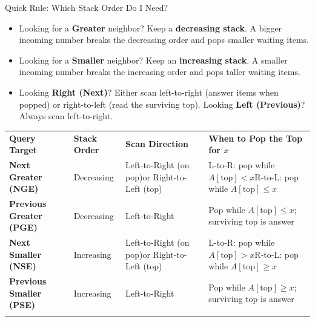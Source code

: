 \documentclass[11pt,a4paper]{article}
\theoremstyle{definition}
\begin{document}
\begin{calloutbox}{Quick Rule: Which Stack Order Do I Need?}
\begin{itemize}
    \item Looking for a \textbf{Greater} neighbor? Keep a \textbf{decreasing stack}. A bigger incoming number breaks the decreasing order and pops smaller waiting items.
    \item Looking for a \textbf{Smaller} neighbor? Keep an \textbf{increasing stack}. A smaller incoming number breaks the increasing order and pops taller waiting items.
    \item Looking \textbf{Right (Next)}? Either scan left-to-right (answer items when popped) or right-to-left (read the surviving top). Looking \textbf{Left (Previous)}? Always scan left-to-right.
\end{itemize}
\end{calloutbox}

\begin{center}
\begingroup
\small
{}
\begin{tabularx}{\textwidth}{>{\raggedright\arraybackslash\bfseries}p{2.9cm} >{\raggedright\arraybackslash}p{2.2cm} >{\raggedright\arraybackslash}p{3.4cm} >{\raggedright\arraybackslash}X}
\arrayrulecolor{primaryblue}\toprule[1.2pt]
\rowcolor{primaryblue!10}
\textcolor{primaryblue}{\textbf{Query Target}} & \textcolor{primaryblue}{\textbf{Stack Order}} & \textcolor{primaryblue}{\textbf{Scan Direction}} & \textcolor{primaryblue}{\textbf{When to Pop the Top for $x$}} \\
\arrayrulecolor{codeframe}\midrule[0.6pt]
Next Greater (NGE) & Decreasing & Left-to-Right (on pop)\newline or Right-to-Left (top) & L-to-R: pop while $A[\text{top}] < x$\newline R-to-L: pop while $A[\text{top}] \le x$ \\
Previous Greater (PGE) & Decreasing & Left-to-Right & Pop while $A[\text{top}] \le x$; surviving top is answer \\
Next Smaller (NSE) & Increasing & Left-to-Right (on pop)\newline or Right-to-Left (top) & L-to-R: pop while $A[\text{top}] > x$\newline R-to-L: pop while $A[\text{top}] \ge x$ \\
Previous Smaller (PSE) & Increasing & Left-to-Right & Pop while $A[\text{top}] \ge x$; surviving top is answer \\
\arrayrulecolor{primaryblue}\bottomrule[1.2pt]
\end{tabularx}
\endgroup
\end{center}
\end{document}
